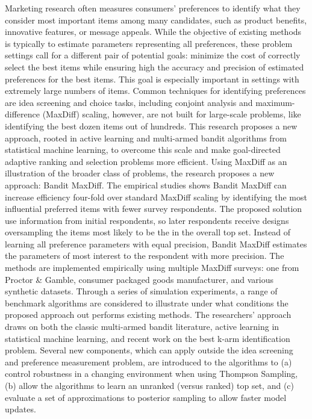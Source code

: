 \documentclass[nonblindrev]{informs3}
\begin{document}
\ABSTRACT
{%
Marketing research often measures consumers' preferences to identify what they consider most important items among many candidates, such as product benefits, innovative features, or message appeals. While the objective of existing methods is typically to estimate parameters representing all preferences, these problem settings call for a different pair of potential goals: minimize the cost of correctly select the best items while ensuring high the accuracy and precision of estimated preferences for the best items. This goal is especially important in settings with extremely large numbers of items. Common techniques for identifying preferences are idea screening and choice tasks, including conjoint analysis and maximum-difference (MaxDiff) scaling, however, are not built for large-scale problems, like identifying the best dozen items out of hundreds. This research proposes a new approach, rooted in active learning and multi-armed bandit algorithms from statistical machine learning, to overcome this scale and make goal-directed adaptive ranking and selection problems more efficient. Using MaxDiff as an illustration of the broader class of problems, the research proposes a new approach: Bandit MaxDiff. The empirical studies shows Bandit MaxDiff can increase efficiency four-fold over standard MaxDiff scaling by identifying the most influential preferred items with fewer survey respondents. The proposed solution use information from initial respondents, so later respondents receive designs oversampling the items most likely to be the in the overall top set. Instead of learning all preference parameters with equal precision, Bandit MaxDiff estimates the parameters of most interest to the respondent with more precision. The methods are implemented empirically using multiple MaxDiff surveys: one from Proctor \& Gamble, consumer packaged goods manufacturer, and various synthetic datasets. Through a series of simulation experiments, a range of benchmark algorithms are considered to illustrate under what conditions the proposed approach out performs existing methods. The researchers' approach draws on both the classic multi-armed bandit literature, active learning in statistical machine learning, and recent work on the best k-arm identification problem. Several new components, which can apply outside the idea screening and preference measurement problem, are introduced to the algorithms to (a) control robustness in a changing environment when using Thompson Sampling, (b) allow the algorithms to learn an unranked (versus ranked) top set, and (c) evaluate a set of approximations to posterior sampling to allow faster model updates.

} ~ \\
\end{document}
